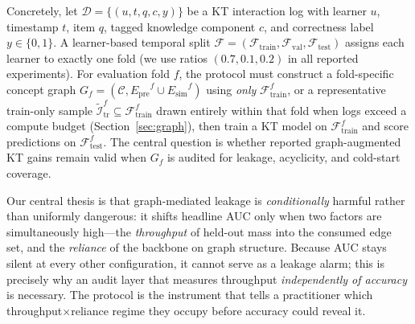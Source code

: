 \documentclass[pdflatex,sn-mathphys-num]{sn-jnl}
\newcommand{\Epre}{\ensuremath{E_{\text{pre}}}}
\newcommand{\Esim}{\ensuremath{E_{\text{sim}}}}
\newcommand{\KC}{knowledge component}
\newenvironment{revbox}{}{}
\begin{document}
Concretely, let $\mathcal{D}=\{(u,t,q,c,y)\}$ be a KT interaction log
with learner $u$, timestamp $t$, item $q$, tagged \KC{} $c$, and
correctness label $y\in\{0,1\}$. A learner-based temporal split
$\mathcal{F}=(\mathcal{F}_{\text{train}},\mathcal{F}_{\text{val}},
\mathcal{F}_{\text{test}})$ assigns each learner to exactly one fold
(we use ratios $(0.7,0.1,0.2)$ in all reported experiments). For
evaluation fold $f$, the protocol must construct a fold-specific concept
graph $G_f=(\mathcal{C},\Epre^f\cup\Esim^f)$ using \emph{only}
$\mathcal{F}_{\text{train}}^f$, or a representative train-only sample
$\tilde{\mathcal{I}}^f_{\text{tr}}\subseteq\mathcal{F}^f_{\text{train}}$
drawn entirely within that fold when logs exceed a compute budget
(Section~\ref{sec:graph}), then train a KT model on
$\mathcal{F}_{\text{train}}^f$ and score predictions on
$\mathcal{F}_{\text{test}}^f$. The central question is whether reported
graph-augmented KT gains remain valid when $G_f$ is audited for leakage,
acyclicity, and cold-start coverage.

\begin{revbox}
Our central thesis is that graph-mediated leakage is \emph{conditionally}
harmful rather than uniformly dangerous: it shifts headline AUC only when two
factors are simultaneously high---the \emph{throughput} of held-out mass into
the consumed edge set, and the \emph{reliance} of the backbone on graph
structure. Because AUC stays silent at every other configuration, it cannot
serve as a leakage alarm; this is precisely why an audit layer that measures
throughput \emph{independently of accuracy} is necessary. The protocol is the
instrument that tells a practitioner which throughput$\times$reliance regime
they occupy before accuracy could reveal it.
\end{revbox}
\end{document}
